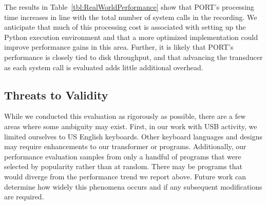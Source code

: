 The results in Table~\ref{tbl:RealWorldPerformance} show that
PORT's
processing time increases in line with the total number of system calls
in the recording.  We anticipate that much of this processing cost is
associated with setting up the Python execution environment and that a more
optimized implementation could improve performance gains in this area.
Further,
it is likely that PORT's performance is closely tied to
disk throughput,
and that advancing the transducer
as each system call is evaluated
adds little additional overhead.


\subsection{Threats to Validity}

While we conducted this evaluation as rigorously as possible,
there are a few areas where some ambiguity may exist.
First, in our work with USB activity, we limited ourselves to US English
keyboards.  Other keyboard languages and designs may require enhancements to our transformer or programs.  Additionally, our performance evaluation samples from only a handful
of programs that were selected by popularity rather than at random.
There may be programs that would diverge from the performance trend we report above. Future work can determine how widely this phenomena occurs and if any subsequent modifications are required.

